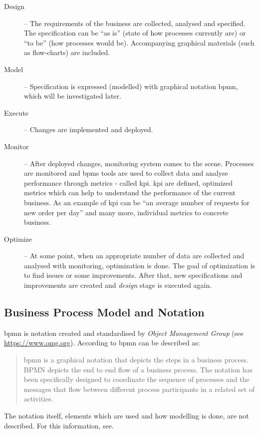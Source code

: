 \begin{description}
	\item[Design] -- The requirements of the business are collected, analysed and specified. The specification can be ``as is'' (state of how processes currently are) or ``to be'' (how processes would be). Accompanying graphical materials (such as flow-charts) are included.
    \item[Model] -- Specification is expressed (modelled) with graphical notation \gls{bpmn}, which will be investigated later.
    \item[Execute] -- Changes are implemented and deployed.
    \item[Monitor] -- After deployed changes, monitoring system comes to the scene. Processes are monitored and \gls{bpms} tools are used to collect data and analyse performance through metrics - called \gls{kpi}. \gls{kpi} are defined, optimized metrics which can help to understand the performance of the current business. As an example of \gls{kpi} can be ``an average number of requests for new order per day'' and many more, individual metrics to concrete business.
    \item[Optimize] -- At some point, when an appropriate number of data are collected and analysed with monitoring, optimization is done. The goal of optimization is to find issues or some improvements. After that, new specifications and improvements are created and \textit{design} stage is executed again.
\end{description}
\subsection{Business Process Model and Notation}
\gls{bpmn} is notation created and standardised by \textit{Object Management Group} (see \url{https://www.omg.org}). According to\cite{bpmn-org-2018} \gls{bpmn} can be described as:
\begin{quote}
  \gls{bpmn} is a graphical notation that depicts the steps in a business process. BPMN depicts the end to end flow of a business process. The notation has been specifically designed to coordinate the sequence of processes and the messages that flow between different process participants in a related set of activities.
\end{quote}
The notation itself, elements which are used and how modelling is done, are not described. For this information, see\cite{bpmn-org-2018}.
